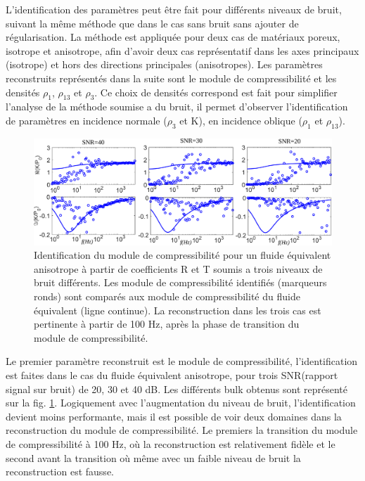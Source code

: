 \documentclass[twoside,openright]{report}
\begin{document}
    L'identification des paramètres peut être fait pour différents niveaux de bruit, suivant la même méthode que dans le cas sans bruit sans ajouter de régularisation. La méthode est appliquée pour deux cas de matériaux poreux, isotrope et anisotrope, afin d'avoir deux cas représentatif dans les axes principaux (isotrope) et hors des directions principales (anisotropes). Les paramètres reconstruits représentés dans la suite sont le module de compressibilité et les densités $\rho_1$, $\rho_{13}$ et $\rho_3$. Ce choix de densités correspond est fait pour simplifier l'analyse de la méthode soumise a du bruit, il permet d'observer l'identification de paramètres en incidence normale ($\rho_3$ et K), en incidence oblique ($\rho_1$ et $\rho_{13}$). 
    
    \begin{figure}[ht!]
        \centering
        \includegraphics[scale=0.4]{Bulk_noise.pdf}
        \caption{Identification du module de compressibilité pour un fluide équivalent anisotrope à partir de coefficients R et T soumis a trois niveaux de bruit différents. Les module de compressibilité identifiés (marqueurs ronds) sont comparés aux module de compressibilité du fluide équivalent (ligne continue). La reconstruction dans les trois cas est pertinente à partir de 100 Hz, après la phase de transition du module de compressibilité.}
        \label{bulk_noise}
    \end{figure}
    
    Le premier paramètre reconstruit est le module de compressibilité, l'identification est faites dans le cas du fluide équivalent anisotrope, pour trois SNR(rapport signal sur bruit) de 20, 30 et 40 dB. Les différents bulk obtenus sont représenté sur la fig. \ref{bulk_noise}. Logiquement avec l'augmentation du niveau de bruit, l'identification devient moins performante, mais il est possible de voir deux domaines dans la reconstruction du module de compressibilité. Le premiers la transition du module de compressibilité à 100 Hz, où la reconstruction est relativement fidèle et le second avant la transition où même avec un faible niveau de bruit la reconstruction est fausse.
    
\end{document}
